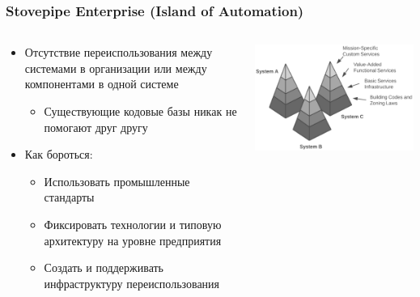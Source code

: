 \documentclass{../cscslides}
\begin{document}
    \begin{frame}
        \frametitle{Stovepipe Enterprise (Island of Automation)}
        \begin{columns}
            \begin{column}{0.6\textwidth}
                \begin{itemize}
                    \item Отсутствие переиспользования между системами в организации или между компонентами в одной системе
                    \begin{itemize}
                        \item Существующие кодовые базы никак не помогают друг другу
                    \end{itemize}
                    \item Как бороться:
                    \begin{itemize}
                        \item Использовать промышленные стандарты
                        \item Фиксировать технологии и типовую архитектуру на уровне предприятия
                        \item Создать и поддерживать инфраструктуру переиспользования
                    \end{itemize}
                \end{itemize}
            \end{column}
            \begin{column}{0.4\textwidth}
                \begin{center}
                    \includegraphics[width=\textwidth]{islandOfAutomation.png} \\

\end{center}
\end{column}
\end{columns}
\end{frame}
\end{document}
